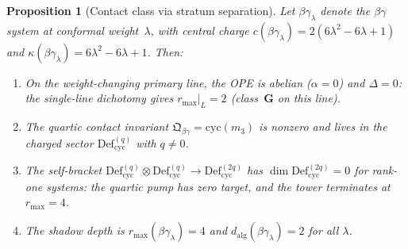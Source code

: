 \documentclass[11pt]{article}
\theoremstyle{plain}
\newtheorem{proposition}[theorem]{Proposition}
\theoremstyle{definition}
\theoremstyle{remark}
\begin{document}
\begin{proposition}[Contact class via stratum separation]
\label{prop:betagamma-contact-standalone}
Let $\beta\gamma_\lambda$ denote the $\beta\gamma$ system at
conformal weight~$\lambda$, with central charge
$c(\beta\gamma_\lambda) = 2(6\lambda^2 - 6\lambda + 1)$ and
$\kappa(\beta\gamma_\lambda) = 6\lambda^2 - 6\lambda + 1$.
Then\textup{:}
\begin{enumerate}[label=\textup{(\roman*)}]
\item On the weight-changing primary line, the OPE is abelian
 \textup{(}$\alpha = 0$\textup{)} and $\Delta = 0$:
 the single-line dichotomy gives $r_{\max}|_L = 2$
 \textup{(}class~$\mathbf{G}$ on this line\textup{)}.
\item The quartic contact invariant
 $\mathfrak{Q}_{\beta\gamma} = \mathrm{cyc}(m_3)$ is nonzero
 and lives in the charged sector
 $\mathrm{Def}_{\mathrm{cyc}}^{(q)}$
 with $q \neq 0$.
\item The self-bracket
 $\mathrm{Def}_{\mathrm{cyc}}^{(q)} \otimes
 \mathrm{Def}_{\mathrm{cyc}}^{(q)} \to
 \mathrm{Def}_{\mathrm{cyc}}^{(2q)}$
 has $\dim \mathrm{Def}_{\mathrm{cyc}}^{(2q)} = 0$ for
 rank-one systems: the quartic pump has zero target, and
 the tower terminates at $r_{\max} = 4$.
\item The shadow depth is $r_{\max}(\beta\gamma_\lambda) = 4$
 and $d_{\mathrm{alg}}(\beta\gamma_\lambda) = 2$ for all
 $\lambda$.
\end{enumerate}
\end{proposition}
\end{document}
